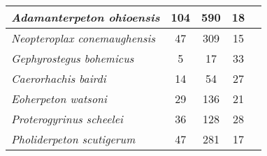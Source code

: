 \begin{tabular}{|L{4.5cm}|c|c|c|L{4.5cm}|}
\textit{Adamanterpeton ohioensis}&104&590&18&\citet{Miln98a}\\\hline
\textit{Neopteroplax conemaughensis}&47&309&15&\citet{Rome63a}\\\hline
\textit{Gephyrostegus bohemicus}&5&17&33&\citet{Brou67a}\\\hline
\textit{Caerorhachis bairdi}&14&54&27&\citet{Holm77a}\\\hline
\textit{Eoherpeton watsoni}&29&136&21&\citet{Smit85a}\\\hline
\textit{Proterogyrinus scheelei}&36&128&28&\citet{Holm84a}\\\hline
\textit{Pholiderpeton scutigerum}&47&281&17&\citet{Clac87a}\\\hline
\end{tabular}
